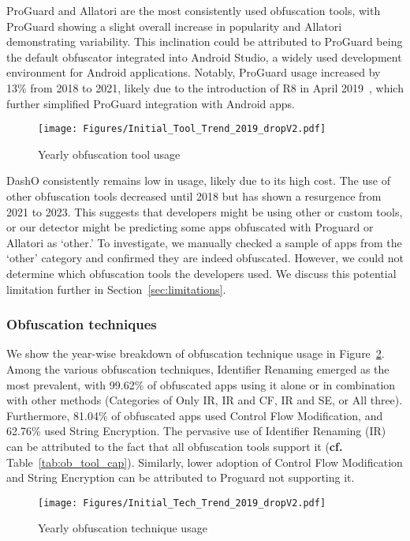 ProGuard and Allatori are the most consistently used obfuscation tools, with ProGuard showing a slight overall increase in popularity and Allatori demonstrating variability. This inclination could be attributed to ProGuard being the default obfuscator integrated into Android Studio, a widely used development environment for Android applications. Notably, ProGuard usage increased by 13\% from 2018 to 2021, likely due to the introduction of R8 in April 2019~\cite{release_note_android}, which further simplified ProGuard integration with Android apps.

\begin{figure}[h]
\centering
    \texttt{[image: Figures/Initial\_Tool\_Trend\_2019\_dropV2.pdf]} 
    \caption{Yearly obfuscation tool usage}
    \label{fig:ofbuscated_tool}
\end{figure}


DashO consistently remains low in usage, likely due to its high cost. The use of other obfuscation tools decreased until 2018 but has shown a resurgence from 2021 to 2023. This suggests that developers might be using other or custom tools, or our detector might be predicting some apps obfuscated with Proguard or Allatori as `other.' To investigate, we manually checked a sample of apps from the `other' category and confirmed they are indeed obfuscated. However, we could not determine which obfuscation tools the developers used. We discuss this potential limitation further in Section~\ref{sec:limitations}.


\subsubsection{Obfuscation techniques} We show the year-wise breakdown of obfuscation technique usage in Figure~\ref{fig:obfuscated_tech}. Among the various obfuscation techniques, Identifier Renaming emerged as the most prevalent, with 99.62\% of obfuscated apps using it alone or in combination with other methods (Categories of Only IR, IR and CF, IR and SE, or All three). Furthermore, 81.04\% of obfuscated apps used Control Flow Modification, and 62.76\% used String Encryption. The pervasive use of Identifier Renaming (IR) can be attributed to the fact that all obfuscation tools support it ({\bf cf.} Table~\ref{tab:ob_tool_cap}). Similarly, lower adoption of Control Flow Modification and String Encryption can be attributed to Proguard not supporting it. 

\begin{figure}[h]
\centering
    \texttt{[image: Figures/Initial\_Tech\_Trend\_2019\_dropV2.pdf]} 
    \caption{Yearly obfuscation technique usage}
    \label{fig:obfuscated_tech}
\end{figure}



